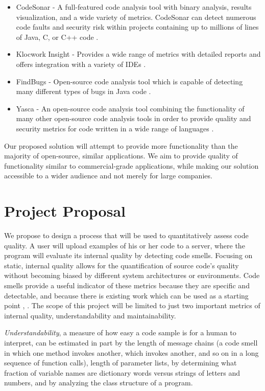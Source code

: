 \documentclass{sig-alternate}
\begin{document}
\begin{itemize}
\item CodeSonar - A full-featured code analysis tool with binary analysis, results visualization, and a wide variety of metrics. CodeSonar can detect numerous code faults and security risk within projects containing up to millions of lines of Java, C, or C++ code \cite{grammatech2013codesonar}.
\item Klocwork Insight - Provides a wide range of metrics with detailed reports and offers integration with a variety of IDEs \cite{klocwork2013insight}.
\item FindBugs - Open-source code analysis tool which is capable of detecting many different types of bugs in Java code \cite{pugh2013findbugs}.
\item Yasca - An open-source code analysis tool combining the functionality of many other open-source code analysis tools in order to provide quality and security metrics for code written in a wide range of languages \cite{scovetta2007yasca}.
\end{itemize}

Our proposed solution will attempt to provide more functionality than the majority of open-source, similar applications. We aim to provide quality of functionality similar to commercial-grade applications, while making our solution accessible to a wider audience and not merely for large companies.

\section{Project Proposal}
\label{sec:project_proposal}
We propose to design a process that will be used to quantitatively assess code quality. A user will upload examples of his or her code to a server, where the program will evaluate its internal quality by detecting code smells. Focusing on static, internal quality allows for the quantification of source code's quality without becoming biased by different system architectures or environments. Code smells provide a useful indicator of these metrics because they are specific and detectable, and because there is existing work which can be used as a starting point \cite{moha2009duchien}, \cite{palomba}.  The scope of this project will be limited to just two important metrics of internal quality, understandability and maintainability. 
	
\emph{Understandability}, a measure of how easy a code sample is for a human to interpret, can be estimated in part by the length of message chains (a code smell in which one method invokes another, which invokes another, and so on in a long sequence of function calls), length of parameter lists, by determining what fraction of variable names are dictionary words versus strings of letters and numbers, and by analyzing the class structure of a program. 
\end{document}
